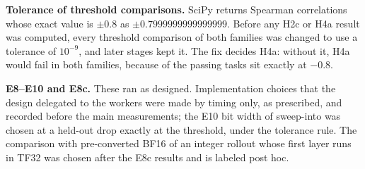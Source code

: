 \textbf{Tolerance of threshold comparisons.} SciPy returns Spearman correlations whose exact value is $\pm0.8$ as $\pm0.7999999999999999$. Before any H2c or H4a result was computed, every threshold comparison of both families was changed to use a tolerance of $10^{-9}$, and later stages kept it. The fix decides H4a: without it, H4a would fail in both families, because  of the  passing tasks sit exactly at $-0.8$.

\textbf{E8--E10 and E8c.} These ran as designed. Implementation choices that the design delegated to the workers were made by timing \dtm only, as prescribed, and recorded before the main measurements; the E10 bit width of sweep-into was chosen at a held-out drop exactly at the threshold, under the tolerance rule. The comparison with pre-converted BF16 of an integer rollout whose first layer runs in TF32 was chosen after the E8c results and is labeled post hoc.

